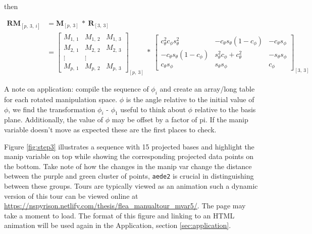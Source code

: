 \documentclass{monashthesis}
\begin{document}
then

\begin{align*}
  \textbf{RM}_{[p,~3,~i]}
  &= \textbf{M}_{[p,~3]} ~*~ \textbf{R}_{[3,~3]} \\
  &= \begin{bmatrix}
    M_{1,~1} & M_{1,~2} & M_{1,~3} \\
    M_{2,~1} & M_{2,~2} & M_{2,~3} \\
    \vdots   & \vdots   \\
    M_{p,~1} & M_{p,~2} & M_{p,~3}
  \end{bmatrix}_{[p,~3]}
    ~*~
  \begin{bmatrix}
    c_\theta^2 c_\phi s_\theta^2 &
    -c_\theta s_\theta (1 - c_\phi) &
    -c_\theta s_\phi \\
    -c_\theta s_\theta (1 - c_\phi) &
    s_\theta^2 c_\phi + c_\theta^2 &
    -s_\theta s_\phi \\
    c_\theta s_\phi &
    s_\theta s_\phi &
    c_\phi
  \end{bmatrix}_{[3,~3]}
\end{align*}

A note on application: compile the sequence of \(\phi_i\) and create an
array/long table for each rotated manipulation space. \(\phi\) is the
angle relative to the initial value of \(\phi\), we find the
transformation \(\phi_i\) - \(\phi_1\) useful to think about \(\phi\)
relative to the basis plane. Additionally, the value of \(\phi\) may be
offset by a factor of pi. If the manip variable doesn't move as expected
these are the first places to check.

\begin{Shaded}
\begin{Highlighting}[]
 
\StringTok{ }\OperatorTok{+}\StringTok{ }
\StringTok{ }\NormalTok{(manip_space, theta, phi)[, }\OperatorTok{:}\NormalTok{]}
\NormalTok{\}}
\end{Highlighting}
\end{Shaded}

Figure \ref{fig:step3} illustrates a sequence with 15 projected bases
and highlight the manip variable on top while showing the corresponding
projected data points on the bottom. Take note of how the changes in the
manip var change the distance between the purple and green cluster of
points, \texttt{aede2} is crucial in distinguishing between these
groups. Tours are typically viewed as an animation such a dynamic
version of this tour can be viewed online at
\url{https://nspyrison.netlify.com/thesis/flea_manualtour_mvar5/}. The
page may take a moment to load. The format of this figure and linking to
an HTML animation will be used again in the Application, section
\ref{sec:application}.
\end{document}
